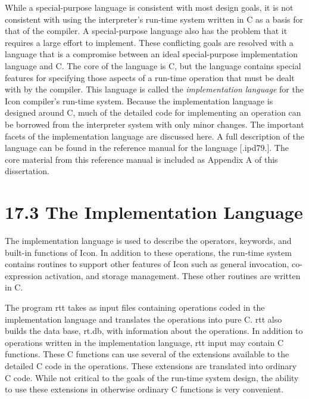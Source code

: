 While a special-purpose language is consistent with most design goals,
it is not consistent with using the interpreter's run-time system
written in C as a basis for that of the compiler. A special-purpose
language also has the problem that it requires a large effort to
implement. These conflicting goals are resolved with a language that
is a compromise between an ideal special-purpose implementation
language and C. The core of the language is C, but the language
contains special features for specifying those aspects of a run-time
operation that must be dealt with by the compiler.  This language is
called the \textit{implementation language} for the Icon compiler's
run-time system. Because the implementation language is designed
around C, much of the detailed code for implementing an operation can
be borrowed from the interpreter system with only minor changes. The
important facets of the implementation language are discussed here. A
full description of the language can be found in the reference manual
for the language [.ipd79.]. The core material from this reference
manual is included as Appendix A of this dissertation.


\section[17.3 The Implementation Language]{17.3 The Implementation Language}

The implementation language is used to describe the operators,
keywords, and built-in functions of Icon. In addition to these
operations, the run-time system contains routines to support other
features of Icon such as general invocation, co-expression activation,
and storage management. These other routines are written in C.

The program rtt takes as input files containing operations coded in
the implementation language and translates the operations into pure
C. rtt also builds the data base, rt.db, with information about the
operations. In addition to operations written in the implementation
language, rtt input may contain C functions. These C functions can use
several of the extensions available to the detailed C code in the
operations. These extensions are translated into ordinary C
code. While not critical to the goals of the run-time system design,
the ability to use these extensions in otherwise ordinary C functions
is very convenient.

